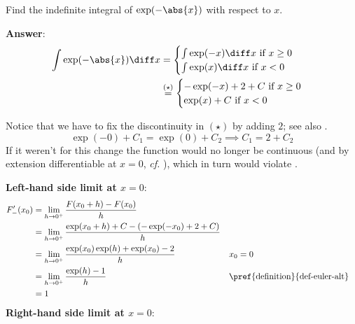 \begin{exm}\label{exm-integration-by-parts:4}
	Find the indefinite integral of $\exp(-\abs{x})$ with respect to $x$.
	\begin{flushleft}
		\textbf{Answer}:
		\begin{align*}
			\int \exp(-\abs{x}) \diff x & = \begin{cases}
				\int \exp(-x) \diff x \text{ if } x\geq0 \\
				\int \exp(x) \diff x \text{ if } x<0     \\
			\end{cases}                    \\
			                            & \overset{(\star)}{=} \begin{cases}
				-\exp(-x) + 2 + C \text{ if } x\geq0 \\
				\exp(x) + C \text{ if } x<0
			\end{cases}
		\end{align*}
	\end{flushleft}
	Notice that we have to fix the discontinuity in $(\star)$ by adding $2$; see
	also .
	\begin{equation*}
		\exp(-0)+C_1 = \exp(0) + C_2  \implies C_1 = 2 + C_2
	\end{equation*}
	If it weren't for this
	change the function would no longer be continuous (and by extension differentiable
	at $x=0$, \textit{cf.} ),
	which in turn would violate .
	\begin{flushleft}
		\textbf{Left-hand side limit at $x=0$}:
		\begin{align*}
			F_-'(x_0) & = \lim_{h\to0^+}\frac{F(x_0+h)-F(x_0)}{h}                                                              \\
			          & = \lim_{h\to0^+}\frac{\exp(x_0+h)+C-(-\exp(-x_0)+2+C)}{h}                                              \\
			          & = \lim_{h\to0^+}\frac{\exp(x_0)\exp(h)+\exp(x_0)-2}{h}    &  & x_0 = 0                                 \\
			          & = \lim_{h\to0^+}\frac{\exp(h)-1}{h}                       &  & \text{\pref{definition}{def-euler-alt}} \\
			          & = 1
		\end{align*}
		\textbf{Right-hand side limit at $x=0$}:
		\begin{align*}

\end{align*}
\end{flushleft}
\end{exm}
